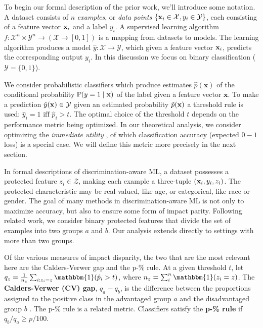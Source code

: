 To begin our formal description of the prior work,
we'll introduce some  notation.  
A dataset consists of $n$ \emph{examples}, 
or \emph{data points}
$\{\mathbf x_i \in \mathcal{X}, y_i \in \mathcal{Y} \}$,
each consisting of a feature vector $\mathbf x_i$ and a label $y_i$.  A supervised learning algorithm $f:\mathcal{X}^n \times \mathcal{Y}^n \rightarrow 
(\mathcal{X} \rightarrow [0,1])$ is a mapping from datasets to models.  The learning algorithm
produces a model 
$\hat{y}: \mathcal{X} \rightarrow \mathcal{Y}$,
which given a feature vector $\mathbf x_i$,
predicts the corresponding output $y_i$.
In this discussion
we focus on binary classification
($\mathcal{Y} = \{0,1\}$).

We consider probabilistic classifiers
which produce estimates $\hat{p}(\mathbf{x})$ of the conditional probability 
$\mathbb{P}(y=1 \mid \mathbf x)$
of the label given a feature vector $\mathbf{x}$. 
To make a prediction $\hat{y}(\mathbf x) \in \mathcal{Y}$
given an estimated probability $\hat{p}(\mathbf x)$ a threshold rule is used: $\hat{y}_i = 1 \text{ iff } \hat{p}_i > t$.
The optimal choice of the threshold $t$
depends on the performance metric being optimized.  In our theoretical analysis, we consider optimizing the \textit{immediate utility}
\citep{corbett2017algorithmic}, of which classification accuracy (expected $0-1$ loss) is a special case.   We will define this metric more precisely in the next section.  


In formal descriptions of discrimination-aware ML,
a dataset  possesses a protected feature $z_i \in \mathcal{Z}$,
making each example a three-tuple $(\mathbf x_i, y_i, z_i)$.
The protected characteristic may be real-valued, like age, 
or categorical, like race or gender.  The goal of many methods in discrimination-aware ML is not only to maximize accuracy, but also to ensure some form of impact parity.
Following related work, 
we consider binary protected features 
that divide the set of examples 
into two groups $a$ and $b$.  Our analysis extends directly to settings with more than two groups.  


Of the various measures of impact disparity,
the two that are the most relevant here are the Calders-Verwer gap and the p-\% rule. At a given threshold $t$, let
\mbox{$q_z = \frac{1}{n_z}\sum_{i : z_i=z}  \mathbbm{1}(\hat p_i > t)$}, where $n_z = \sum_{i}^{n} \mathbbm{1}(z_i = z)$. 
The \textbf{Calders-Verwer (CV) gap},
$q_a - q_b$,
is the difference between the proportions 
assigned to the positive class 
in the advantaged group $a$ and the disadvantaged  group $b$ \citep{kamishima2011fairness}.
The p-\% rule 
is a related metric\cite{zafar2017fairness}. 
Classifiers satisfy the \textbf{p-\% rule} 
if $q_b / q_a \ge p/100$.  


